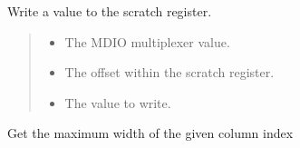 \documentclass[letterpaper,10pt,english]{sphinxmanual}
\begin{document}
\begin{fulllineitems}
\label{\detokenize{cplddocs:phy_marvell_88X2222_init.write_scratch}}
\pysigstartsignatures
{}
\pysigstopsignatures
\sphinxAtStartPar
Write a value to the scratch register.
\begin{quote}\begin{description}
\begin{itemize}
\item {} 
\sphinxAtStartPar
{} \textendash{} The MDIO multiplexer value.

\item {} 
\sphinxAtStartPar
{} \textendash{} The offset within the scratch register.

\item {} 
\sphinxAtStartPar
{} \textendash{} The value to write.

\end{itemize}

\end{description}\end{quote}

\end{fulllineitems}

\label{\detokenize{cplddocs:module-reg}}

\begin{fulllineitems}
\label{\detokenize{cplddocs:reg.get_max_width}}
\pysigstartsignatures
{}
\pysigstopsignatures
\sphinxAtStartPar
Get the maximum width of the given column index

\end{fulllineitems}

\end{document}

